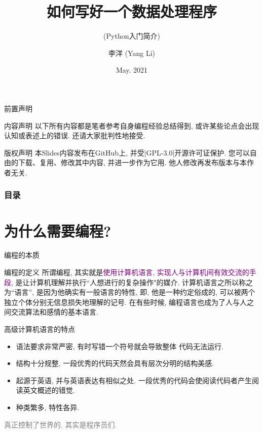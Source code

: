 \documentclass{beamer}
\title[CMT.Tsinghua]{如何写好一个数据处理程序}
\subtitle{(Python入门简介)}
\author[Yang Li]{
  李洋 (Yang Li)\inst{1}}
\institute[Physics@Tsinghua]{
  \inst{1} Department of Physics\\
           Tsinghua University 
}
\date[Tsinghua Physics 2021]{May. 2021}
\newcommand{\purple}{\textcolor{purple}}
\begin{document}
  \frame{\titlepage}

  \begin{frame}[fragile]{前置声明}
    \begin{block}{内容声明}
      以下所有内容都是笔者参考自身编程经验总结得到, 或许某些论点会出现认知或表述上的错误. 还请大家批判性地接受.
    \end{block}
    \begin{block}{版权声明}
      本Slides内容发布在GitHub上, 并受\cverb|GPL-3.0|开源许可证保护. 您可以自由的下载、复用、修改其中内容, 并进一步作为它用. 他人修改再发布版本与本作者无关.
    \end{block}
  \end{frame}

  \begin{frame}
    \frametitle{目录}
    \tableofcontents
  \end{frame}

  \section{为什么需要编程?}
    \begin{frame}{编程的本质}
      \begin{block}{编程的定义}
        所谓编程, 其实就是\purple{使用计算机语言, 实现人与计算机间有效交流的手段}, 是让计算机理解并执行``人想进行的复杂操作"的媒介. 计算机语言之所以称之为``语言'', 是因为他确实有一般语言的特性, 即, 他是一种约定俗成的, 可以被两个独立个体分别无信息损失地理解的记号. 在有些时候, 编程语言也成为了人与人之间交流算法和感情的基本语言.
      \end{block}
      \begin{block}{高级计算机语言的特点}
        \begin{itemize}
          \item 语法要求非常严密, 有时写错一个符号就会导致整体 代码无法运行.
          \item 结构十分规整, 一段优秀的代码天然会具有层次分明的结构美感.
          \item 起源于英语, 并与英语表达有相似之处. 一段优秀的代码会使阅读代码者产生阅读英文概述的错觉.
          \item 种类繁多, 特性各异.
        \end{itemize}
      \end{block}
      \textcolor{gray}{真正控制了世界的, 其实是程序员们.}
    \end{frame}
\end{document}
